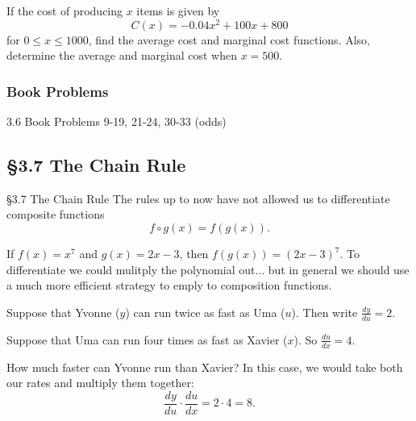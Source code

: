 \documentclass[cal1spr16Lectures.tex]{subfiles}
\begin{document}
\begin{frame}
\begin{exe} If the cost of producing $x$ items is given by 
\[C(x)=-0.04x^2+100x+800\]
for $0 \le x \le 1000$, find the average cost and marginal cost functions.  Also, determine the average and marginal cost when $x=500.$ \end{exe}
\end{frame}

\subsubsection{Book Problems}

\begin{frame}
\begin{block}{3.6 Book Problems} 9-19, 21-24, 30-33 (odds) \end{block}
\end{frame}

\subsection[3.7 The Chain Rule]{\S 3.7 The Chain Rule}

\begin{frame}{\S 3.7 The Chain Rule}\footnotesize
The rules up to now have not allowed us to differentiate composite functions 
\[
f\circ g(x)=f(g(x)).
\]
\begin{ex}
If $f(x)=x^7$ and $g(x)=2x-3$, then $f(g(x))=(2x-3)^7$.  To differentiate we could mulitply the polynomial out... but in general we should use a much more efficient strategy to emply to composition functions. 
\end{ex}
\end{frame}

\begin{frame}\footnotesize
\begin{ex}
Suppose that Yvonne ($y$) can run twice as fast as Uma ($u$). Then write $\textstyle\frac{dy}{du}=2$.

\vspace{0.5pc}
Suppose that Uma can run four times as fast as Xavier ($x$).  So $\textstyle\frac{du}{dx}=4$.

\vspace{1pc}
How much faster can Yvonne run than Xavier?  In this case, we would take both our rates and multiply them together:
\[\frac{dy}{du} \cdot \frac{du}{dx}=2 \cdot 4 = 8.\]
\end{ex}
\end{frame}
\end{document}
